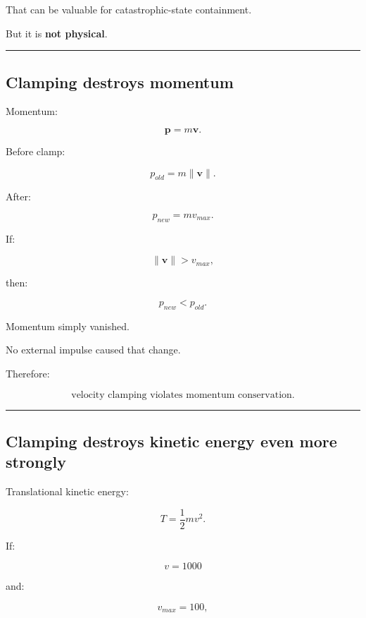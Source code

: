 That can be valuable for catastrophic-state containment.

But it is \textbf{not physical}.

\begin{center}\rule{0.5\linewidth}{0.5pt}\end{center}

\subsection{Clamping destroys momentum}\label{06-engine-ii-ch038-clamping-destroys-momentum}

\hypertarget{06-engine-ii-ch038-clamping-destroys-momentum}{}

Momentum:

\[
\mathbf p=m\mathbf v.
\]

Before clamp:

\[
p_{old}=m\|\mathbf v\|.
\]

After:

\[
p_{new}=mv_{max}.
\]

If:

\[
\|\mathbf v\|>v_{max},
\]

then:

\[
p_{new}<p_{old}.
\]

Momentum simply vanished.

No external impulse caused that change.

Therefore:

\[
\boxed{
\text{velocity clamping violates momentum conservation.}
}
\]

\begin{center}\rule{0.5\linewidth}{0.5pt}\end{center}

\subsection{Clamping destroys kinetic energy even more strongly}\label{06-engine-ii-ch038-clamping-destroys-kinetic-energy-even-more-strongly}

\hypertarget{06-engine-ii-ch038-clamping-destroys-kinetic-energy-even-more-strongly}{}

Translational kinetic energy:

\[
T=
\frac12mv^2.
\]

If:

\[
v=1000
\]

and:

\[
v_{max}=100,
\]

